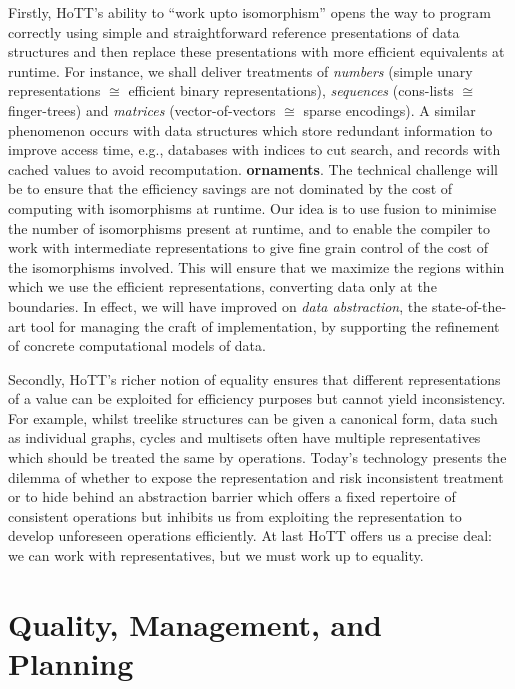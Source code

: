 \documentclass[a4paper,11pt]{article}
\begin{document}
Firstly, HoTT's ability to ``work upto isomorphism'' opens the way to
program correctly using simple and straightforward reference
presentations of data structures and then replace these presentations
with more efficient equivalents at runtime. For instance, we shall
deliver treatments of \emph{numbers} (simple unary representations $\cong$
efficient binary representations), \emph{sequences} (cons-lists $\cong$
finger-trees) and \emph{matrices} (vector-of-vectors $\cong$ sparse
encodings). %
A similar phenomenon occurs with data structures which store redundant
information to improve access time, e.g., databases with indices to
cut search, and records with cached values to avoid
recomputation. {\bf ornaments}. The technical challenge will be to
ensure that the efficiency savings are not dominated by the cost of
computing with isomorphisms at runtime. Our idea is to use fusion to
minimise the number of isomorphisms present at runtime, and to enable
the compiler to work with intermediate representations to give fine
grain control of the cost of the isomorphisms involved.  This will
ensure that we maximize the regions within which we use the efficient
representations, converting data only at the boundaries.  In effect,
we will have improved on \emph{data abstraction}, the state-of-the-art
tool for managing the craft of implementation, by supporting the
refinement of concrete computational models of data.

Secondly, HoTT's richer notion of equality ensures that different
representations of a value can be exploited for efficiency purposes
but cannot yield inconsistency. For example, whilst treelike
structures can be given a canonical form, data such as individual graphs, cycles
and multisets often have multiple representatives which should be
treated the same by operations. Today's technology presents the
dilemma of whether to expose the representation and risk inconsistent
treatment or to hide behind an abstraction barrier which offers a
fixed repertoire of consistent operations but inhibits us from
exploiting the representation to develop unforeseen operations
efficiently. At last HoTT offers us a precise deal: we can work with
representatives, but we must work up to equality. 

\section{Quality, Management, and Planning}
\end{document}
